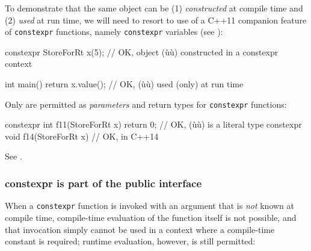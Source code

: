 To demonstrate that the same object can be (1) \emph{constructed} at
compile time and (2) \emph{used} at run time, we will need to resort to
use of a C++11 companion feature of \lstinline!constexpr! functions, namely
\lstinline!constexpr! variables (see ):

\begin{emcppslisting}[emcppsbatch=e4]
constexpr StoreForRt x(5);  // OK, object (ù{}ù) constructed in a constexpr context

int main() { return x.value(); }  // OK, (ù{}ù) used (only) at run time
\end{emcppslisting}


\noindent Only  are permitted as \emph{parameters} and
return types for \lstinline!constexpr! functions:

\begin{emcppslisting}[emcppsbatch=e4,emcppserrorlines={2}]
constexpr int  f11(StoreForRt x) { return 0; }  // OK, (ù{}ù) is a literal type
constexpr void f14(StoreForRt x) { }            // OK, in C++14
\end{emcppslisting}


\noindent See .

\subsubsection[\lstinline!constexpr! is part of the public interface]{{\SubsubsecCode constexpr} is part of the public interface}\label{constexpr-is-part-of-the-public-interface}

When a \lstinline!constexpr! function is invoked with an argument that is
\emph{not} known at compile time, compile-time evaluation of the
function itself is not possible, and that invocation simply cannot be
used in a context where a compile-time constant is required; runtime
evaluation, however, is still permitted:

